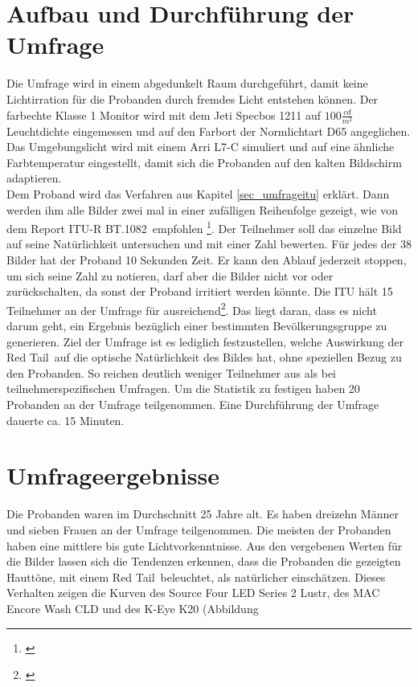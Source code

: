\section{Aufbau und Durchführung der Umfrage} 
Die Umfrage wird in einem abgedunkelt Raum durchgeführt, damit keine Lichtirration für die Probanden durch fremdes Licht entstehen können. Der farbechte \glqq Klasse 1\grqq\- Monitor wird mit dem Jeti Specbos 1211 auf $100\frac{cd}{m^{2}}$ Leuchtdichte eingemessen und auf den Farbort der Normlichtart D65 angeglichen. Das Umgebungslicht wird mit einem Arri L7-C simuliert und  auf eine ähnliche Farbtemperatur eingestellt, damit sich die Probanden auf den kalten Bildschirm adaptieren.\\
Dem Proband wird das Verfahren aus Kapitel \ref{sec_umfrageitu} erklärt. Dann werden ihm alle Bilder zwei mal in einer zufälligen Reihenfolge gezeigt, wie von dem \glqq Report ITU-R BT.1082\grqq\ empfohlen \footnote{\cite[368]{itu90}}. Der Teilnehmer soll das einzelne Bild auf seine Natürlichkeit untersuchen und mit einer Zahl bewerten. Für jedes der 38 Bilder hat der Proband 10 Sekunden Zeit. Er kann den Ablauf jederzeit stoppen, um sich seine Zahl zu notieren, darf aber die Bilder nicht vor oder zurückschalten, da sonst der Proband irritiert werden könnte. Die ITU hält 15 Teilnehmer an der Umfrage für ausreichend\footnote{\cite[368]{itu90}}. Das liegt daran, dass es nicht darum geht, ein Ergebnis bezüglich einer bestimmten Bevölkerungsgruppe zu generieren. Ziel der Umfrage ist es lediglich festzustellen, welche Auswirkung der \glqq Red Tail\grqq\ auf die optische Natürlichkeit des Bildes hat, ohne speziellen Bezug zu den Probanden. So reichen deutlich weniger Teilnehmer aus als bei teilnehmerspezifischen Umfragen. Um die Statistik zu festigen haben 20 Probanden an der Umfrage teilgenommen. Eine Durchführung der Umfrage dauerte ca. 15 Minuten.


\section{Umfrageergebnisse}
Die Probanden waren im Durchschnitt 25 Jahre alt. Es haben dreizehn Männer und sieben Frauen an der Umfrage teilgenommen. Die meisten der Probanden haben eine mittlere bis gute Lichtvorkenntnisse. 
Aus den vergebenen Werten für die Bilder lassen sich die Tendenzen erkennen, dass die Probanden die gezeigten Hauttöne, mit einem \glqq Red Tail\grqq\ beleuchtet, als natürlicher einschätzen. Dieses Verhalten zeigen die Kurven des Source Four LED Series 2 Lustr, des MAC Encore Wash CLD und des K-Eye K20 (Abbildung %


